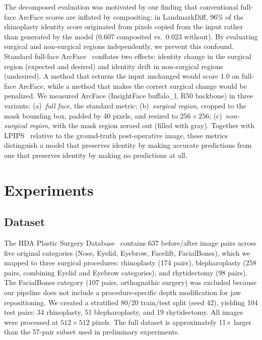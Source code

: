 \documentclass[runningheads]{llncs}
\begin{document}
The decomposed evaluation was motivated by our finding that conventional
full-face ArcFace scores are inflated by compositing: in LandmarkDiff,
96\% of the rhinoplasty identity score originated from pixels copied from the input
rather than generated by the model (0.607 composited vs.\ 0.023 without).
By evaluating surgical and non-surgical regions independently, we prevent
this confound. Standard full-face ArcFace~\cite{deng2019arcface} conflates
two effects: identity change in the surgical region (expected and desired)
and identity drift in non-surgical regions (undesired). A method that
returns the input unchanged would score 1.0 on full-face ArcFace, while a
method that makes the correct surgical change would be penalized. We
measured ArcFace (InsightFace buffalo\_l, R50 backbone) in three variants:
(a)~\emph{full face}, the standard metric;
(b)~\emph{surgical region}, cropped to the mask bounding box, padded by
40 pixels, and resized to $256 \times 256$;
(c)~\emph{non-surgical region}, with the mask region zeroed out (filled
with gray). Together with LPIPS~\cite{zhang2018lpips} relative to the
ground-truth post-operative image, these metrics distinguish a model that
preserves identity by making accurate predictions from one that preserves
identity by making no predictions at all.

\section{Experiments}
\label{sec:experiments}

\subsection{Dataset}

The HDA Plastic Surgery Database~\cite{rathgeb2020plastic} contains 637
before/after image pairs across five original categories (Nose, Eyelid,
Eyebrow, Facelift, FacialBones), which we mapped to three surgical
procedures: rhinoplasty (174 pairs), blepharoplasty (258 pairs, combining
Eyelid and Eyebrow categories), and rhytidectomy (98 pairs). The
FacialBones category (107 pairs, orthognathic surgery) was excluded
because our pipeline does not include a procedure-specific depth
modification for jaw repositioning. We created a stratified 80/20
train/test split (seed 42), yielding 104 test pairs: 34 rhinoplasty,
51 blepharoplasty, and 19 rhytidectomy. All images were processed at
$512 \times 512$ pixels. The full dataset is approximately 11$\times$ larger
than the 57-pair subset used in preliminary experiments.
\end{document}
